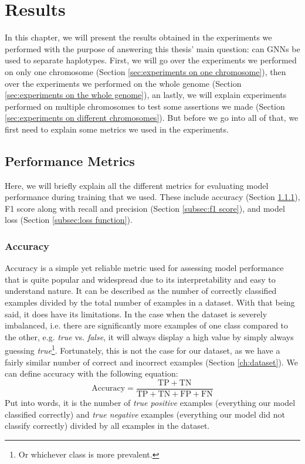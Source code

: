 \documentclass[times, utf8, diplomski, english]{fer_eng}
\begin{document}
\chapter{Results}
\label{ch:results}

In this chapter, we will present the results obtained in the experiments we performed with the purpose of answering this thesis' main question: can GNNs be used to separate haplotypes. First, we will go over the experiments we performed on only one chromosome (Section \ref{sec:experiments on one chromosome}), then over the experiments we performed on the whole genome (Section \ref{sec:experiments on the whole genome}), an lastly, we will explain experiments performed on multiple chromosomes to test some assertions we made (Section \ref{sec:experiments on different chromosomes}). But before we go into all of that, we first need to explain some metrics we used in the experiments.

\section{Performance Metrics}

Here, we will briefly explain all the different metrics for evaluating model performance during training that we used. These include accuracy (Section \ref{subsec:accuracy}), F1 score along with recall and precision (Section \ref{subsec:f1 score}), and model loss (Section \ref{subsec:loss function}).

\subsection{Accuracy}
\label{subsec:accuracy}

Accuracy is a simple yet reliable metric used for assessing model performance that is quite popular and widespread due to its interpretability and easy to understand nature. It can be described as the number of correctly classified examples divided by the total number of examples in a dataset. With that being said, it does have its limitations. In the case when the dataset is severely imbalanced, i.e. there are significantly more examples of one class compared to the other, e.g. \textit{true} vs. \textit{false}, it will always display a high value by simply always guessing \textit{true}\footnote{Or whichever class is more prevalent.}. Fortunately, this is not the case for our dataset, as we have a fairly similar number of correct and incorrect examples (Section \ref{ch:dataset}). We can define accuracy with the following equation:
\[ \mathrm{Accuracy} = \frac{\mathrm{TP} + \mathrm{TN}}{\mathrm{TP} + \mathrm{TN} + \mathrm{FP} + \mathrm{FN}} \]
Put into words, it is the number of \textit{true positive} examples (everything our model classified correctly) and \textit{true negative} examples (everything our model did not classify correctly) divided by all examples in the dataset.
\end{document}

